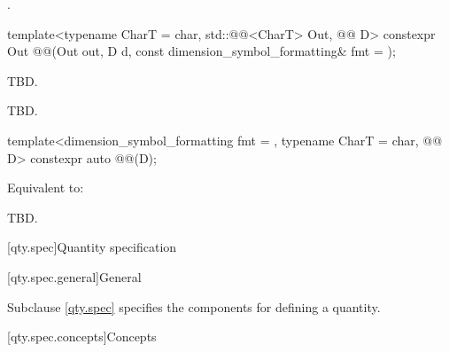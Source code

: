 \begin{itemdescr}
\pnum
\returns
{}.
\end{itemdescr}

\begin{itemdecl}
template<typename CharT = char, std::@@<CharT> Out, @@ D>
constexpr Out @@(Out out, D d, const dimension_symbol_formatting& fmt = {});
\end{itemdecl}

\begin{itemdescr}
\pnum
\effects
TBD.

\pnum
\returns
TBD.
\end{itemdescr}

\begin{itemdecl}
template<dimension_symbol_formatting fmt = {}, typename CharT = char, @@ D>
constexpr auto @@(D);
\end{itemdecl}

\begin{itemdescr}
\pnum
\effects
Equivalent to:
\begin{codeblock}
TBD.
\end{codeblock}
\end{itemdescr}

[qty.spec]{Quantity specification}

[qty.spec.general]{General}

\pnum
Subclause \ref{qty.spec} specifies the components
for defining a quantity.

[qty.spec.concepts]{Concepts}

